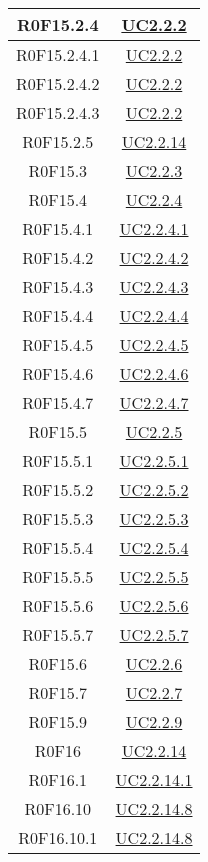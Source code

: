 \documentclass[../AnalisiDeiRequisiti.tex]{subfiles}
\begin{document}
\begin{longtable}{|c|c|}
	R0F15.2.4 & \hyperlink{UC2.2.2}{UC2.2.2}\\\hline
	R0F15.2.4.1 & \hyperlink{UC2.2.2}{UC2.2.2}\\\hline
	R0F15.2.4.2 & \hyperlink{UC2.2.2}{UC2.2.2}\\\hline
	R0F15.2.4.3 & \hyperlink{UC2.2.2}{UC2.2.2}\\\hline
	R0F15.2.5 & \hyperlink{UC2.2.14}{UC2.2.14}\\\hline
	R0F15.3 & \hyperlink{UC2.2.3}{UC2.2.3}\\\hline
	R0F15.4 & \hyperlink{UC2.2.4}{UC2.2.4}\\\hline
	R0F15.4.1 & \hyperlink{UC2.2.4.1}{UC2.2.4.1}\\\hline
	R0F15.4.2 & \hyperlink{UC2.2.4.2}{UC2.2.4.2}\\\hline
	R0F15.4.3 & \hyperlink{UC2.2.4.3}{UC2.2.4.3}\\\hline
	R0F15.4.4 & \hyperlink{UC2.2.4.4}{UC2.2.4.4}\\\hline
	R0F15.4.5 & \hyperlink{UC2.2.4.5}{UC2.2.4.5}\\\hline
	R0F15.4.6 & \hyperlink{UC2.2.4.6}{UC2.2.4.6}\\\hline
	R0F15.4.7 & \hyperlink{UC2.2.4.7}{UC2.2.4.7}\\\hline
	R0F15.5 & \hyperlink{UC2.2.5}{UC2.2.5}\\\hline
	R0F15.5.1 & \hyperlink{UC2.2.5.1}{UC2.2.5.1}\\\hline
	R0F15.5.2 & \hyperlink{UC2.2.5.2}{UC2.2.5.2}\\\hline
	R0F15.5.3 & \hyperlink{UC2.2.5.3}{UC2.2.5.3}\\\hline
	R0F15.5.4 & \hyperlink{UC2.2.5.4}{UC2.2.5.4}\\\hline
	R0F15.5.5 & \hyperlink{UC2.2.5.5}{UC2.2.5.5}\\\hline
	R0F15.5.6 & \hyperlink{UC2.2.5.6}{UC2.2.5.6}\\\hline
	R0F15.5.7 & \hyperlink{UC2.2.5.7}{UC2.2.5.7}\\\hline
	R0F15.6 & \hyperlink{UC2.2.6}{UC2.2.6}\\\hline
	R0F15.7 & \hyperlink{UC2.2.7}{UC2.2.7}\\\hline
	R0F15.9 & \hyperlink{UC2.2.9}{UC2.2.9}\\\hline
	R0F16 & \hyperlink{UC2.2.14}{UC2.2.14}\\\hline
	R0F16.1 & \hyperlink{UC2.2.14.1}{UC2.2.14.1}\\\hline
	R0F16.10 & \hyperlink{UC2.2.14.8}{UC2.2.14.8}\\\hline
	R0F16.10.1 & \hyperlink{UC2.2.14.8}{UC2.2.14.8}\\\hline

\end{longtable}
\end{document}
